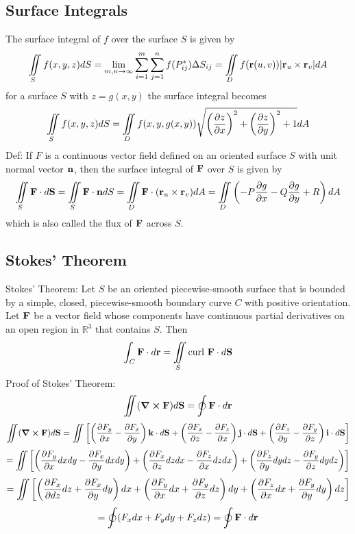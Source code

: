 \documentclass{article}
\begin{document}
    \subsection{Surface Integrals}
    \begin{outline}
        \1 The surface integral of $f$ over the surface $S$ is given by \[\iint\limits_Sf(x,y,z)dS=\lim_{m,n\to\infty}\sum^m_{i=1}\sum^n_{j=1}f(P^*_{ij})\Delta S_{ij}=\iint\limits_Df(\vb r(u,v))|\vb r_u\times\vb r_v|dA\]
        \1 for a surface $S$ with \(z=g(x,y)\) the surface integral becomes \[\iint\limits_Sf(x,y,z)dS=\iint\limits_Df(x,y,g(x,y))\sqrt{\left(\pdv{z}{x}\right)^2+\left(\pdv{z}{y}\right)^2+1}dA\]
        \1 Def: If $F$ is a continuous vector field defined on an oriented surface $S$ with unit normal vector $\vb n$, then the surface integral of \(\vb F\) over $S$ is given by \[\iint\limits_S\vb F\cdot d\vb S=\iint\limits_S\vb F\cdot\vb ndS=\iint\limits_D\vb F\cdot(\vb r_u\times\vb r_v)dA=\iint\limits_D\left(-P\pdv{g}{x}-Q\pdv{g}{y}+R\right)dA\] which is also called the flux of \(\vb F\) across $S$. 

    \end{outline}
    \subsection{Stokes' Theorem}
    \begin{outline}
        \1 Stokes' Theorem: Let $S$ be an oriented piecewise-smooth surface that is bounded by a simple, closed, piecewise-smooth boundary curve $C$ with positive orientation. Let \(\vb F\) be a vector field whose components have continuous partial derivatives on an open region in \(\mathbb R^3\) that contains $S$. Then \[\int_C\vb F\cdot d\vb r=\iint\limits_S\text{curl }\vb F\cdot d\vb S\]
        \1 Proof of Stokes' Theorem: \[\iint(\curl\vb F)d\vb S=\oint\vb F\cdot d\vb r\]
        \[\iint(\curl\vb F)d\vb S=\iint\left[\left(\pdv{F_y}{x}-\pdv{F_x}{y}\right)\vb k\cdot d\vb S+\left(\pdv{F_x}{z}-\pdv{F_z}{x}\right)\vb j\cdot d\vb S+\left(\pdv{F_z}{y}-\pdv{F_y}{z}\right)\vb i\cdot d\vb S\right]\]
        \[=\iint\left[\left(\pdv{F_y}{x}dxdy-\pdv{F_x}{y}dxdy\right)+\left(\pdv{F_x}{z}dzdx-\pdv{F_z}{x}dzdx\right)+\left(\pdv{F_z}{y}dydz-\pdv{F_y}{z}dydz\right)\right]\]
        \[=\iint\left[\left(\pdv{F_x}{dz}dz+\pdv{F_x}{y}dy\right)dx+\left(\pdv{F_y}{x}dx+\pdv{F_y}{z}dz\right)dy+\left(\pdv{F_z}{x}dx+\pdv{F_y}{y}dy\right)dz\right]\]
        \[=\oint(F_xdx+F_ydy+F_zdz)=\oint\vb F\cdot d\vb r\]
    \end{outline}
\end{document}
